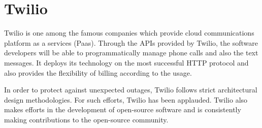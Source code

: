 \section{Twilio}

Twilio is one among the famous companies which provide cloud communications
platform as a services (Paas). Through the APIs provided by Twilio, the software
developers will be able to programmatically manage phone calls and also the text
messages. It deploys its technology on the most successful HTTP protocol and
also provides the flexibility of billing according to the usage.

In order to protect against unexpected outages, Twilio follows strict
architectural design methodologies. For such efforts, Twilio has been applauded.
Twilio also makes efforts in the development of open-source software and is
consistently making contributions to the open-source community.~\cite{Twilio}



